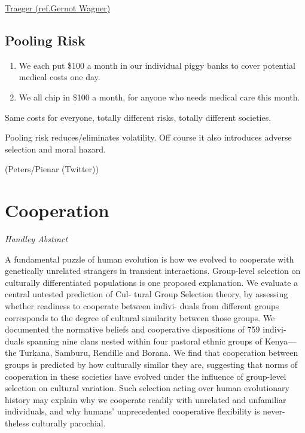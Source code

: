 \documentclass[
]{book}
\begin{document}
\href{https://www.frbsf.org/economic-research/events/2021/february/christian-traeger-uncertainty-and-climate-change/}{Traeger (ref.Gernot Wagner)}

\hypertarget{pooling-risk}{%
\section{Pooling Risk}\label{pooling-risk}}

\begin{enumerate}
\def\labelenumi{\Alph{enumi})}
\item
  We each put \$100 a month in our individual piggy banks to cover potential medical costs one day.
\item
  We all chip in \$100 a month, for anyone who needs medical care this month.
\end{enumerate}

Same costs for everyone, totally different risks, totally different societies.

Pooling risk reduces/eliminates volatility.
Off course it also introduces adverse selection and moral hazard.

(Peters/Pienar (Twitter))

\hypertarget{cooperation}{%
\chapter{Cooperation}\label{cooperation}}

\emph{Handley Abstract}

A fundamental puzzle of human evolution is how we evolved to cooperate with genetically
unrelated strangers in transient interactions. Group-level selection on culturally differentiated
populations is one proposed explanation. We evaluate a central untested prediction of Cul-
tural Group Selection theory, by assessing whether readiness to cooperate between indivi-
duals from different groups corresponds to the degree of cultural similarity between those
groups. We documented the normative beliefs and cooperative dispositions of 759 indivi-
duals spanning nine clans nested within four pastoral ethnic groups of Kenya---the Turkana,
Samburu, Rendille and Borana. We find that cooperation between groups is predicted by how
culturally similar they are, suggesting that norms of cooperation in these societies have
evolved under the influence of group-level selection on cultural variation. Such selection
acting over human evolutionary history may explain why we cooperate readily with unrelated
and unfamiliar individuals, and why humans' unprecedented cooperative flexibility is never-
theless culturally parochial.
\end{document}

